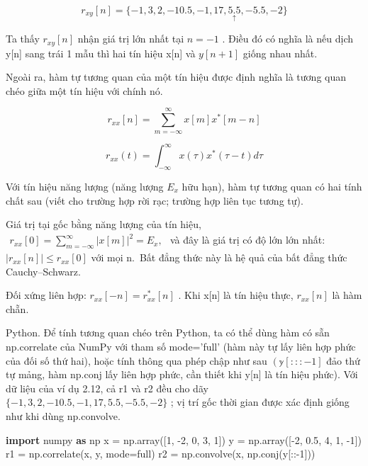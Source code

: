 \documentclass[
  10
]{article}
\newenvironment{Shaded}{}{}
\newcommand{\DecValTok}[1]{\textcolor[rgb]{0.25,0.63,0.44}{#1}}
\newcommand{\FloatTok}[1]{\textcolor[rgb]{0.25,0.63,0.44}{#1}}
\newcommand{\ImportTok}[1]{\textcolor[rgb]{0.00,0.50,0.00}{\textbf{#1}}}
\newcommand{\NormalTok}[1]{#1}
\newcommand{\OperatorTok}[1]{\textcolor[rgb]{0.40,0.40,0.40}{#1}}
\newcommand{\StringTok}[1]{\textcolor[rgb]{0.25,0.44,0.63}{#1}}
\begin{document}
\[
r _ {x y} [ n ] = \{- 1, 3, 2, - 1 0. 5, - 1, 1 7, \underset {\uparrow} {5. 5}, - 5. 5, - 2 \}
\]

Ta thấy \(r _ { x y } [ n ]\) nhận giá trị lớn nhất tại \(n = - 1\) .
Điều đó có nghĩa là nếu dịch y{[}n{]} sang trái 1 mẫu thì hai tín hiệu
x{[}n{]} và \(y [ n + 1 ]\) giống nhau nhất. 

Ngoài ra, hàm tự tương quan của một tín hiệu được định nghĩa là tương
quan chéo giữa một tín hiệu với chính nó.

\[
r _ {x x} [ n ] = \sum_ {m = - \infty} ^ {\infty} x [ m ] x ^ {*} [ m - n ]
\]

\[
r _ {x x} (t) = \int_ {- \infty} ^ {\infty} x (\tau) x ^ {*} (\tau - t) d \tau
\]

Với tín hiệu năng lượng (năng lượng \(E _ { x }\) hữu hạn), hàm tự tương
quan có hai tính chất sau (viết cho trường hợp rời rạc; trường hợp liên
tục tương tự).

Giá trị tại gốc bằng năng lượng của tín hiệu,
\(\begin{array} { r } { r _ { x x } [ 0 ] = \sum _ { m = - \infty } ^ { \infty } | x [ m ] | ^ { 2 } = E _ { x } , } \end{array}\)
và đây là giá trị có độ lớn lớn nhất:
\(| r _ { x x } [ n ] | \leq r _ { x x } [ 0 ]\) với mọi n.~Bất đẳng
thức này là hệ quả của bất đẳng thức Cauchy--Schwarz.

Đối xứng liên hợp: \(r _ { x x } [ - n ] = r _ { x x } ^ { * } [ n ]\) .
Khi x{[}n{]} là tín hiệu thực, \(r _ { x x } [ n ]\) là hàm chẵn.

Python. Để tính tương quan chéo trên Python, ta có thể dùng hàm có sẵn
np.correlate của NumPy với tham số mode='full' (hàm này tự lấy liên hợp
phức của đối số thứ hai), hoặc tính thông qua phép chập như sau
\(\left( \mathbb { y } \left[ : : : - 1 \right] \right.\) đảo thứ tự
mảng, hàm np.conj lấy liên hợp phức, cần thiết khi y{[}n{]} là tín hiệu
phức). Với dữ liệu của ví dụ 2.12, cả r1 và r2 đều cho dãy
\(\{ - 1 , 3 , 2 , - 1 0 . 5 , - 1 , 1 7 , 5 . 5 , - 5 . 5 , - 2 \}\) ;
vị trí gốc thời gian được xác định giống như khi dùng np.convolve.

\begin{Shaded}
\begin{Highlighting}[]
\ImportTok{import}\NormalTok{ numpy }\ImportTok{as}\NormalTok{ np}
\NormalTok{x }\OperatorTok{=}\NormalTok{ np.array([}\DecValTok{1}\NormalTok{, }\OperatorTok{{-}}\DecValTok{2}\NormalTok{, }\DecValTok{0}\NormalTok{, }\DecValTok{3}\NormalTok{, }\DecValTok{1}\NormalTok{])}
\NormalTok{y }\OperatorTok{=}\NormalTok{ np.array([}\OperatorTok{{-}}\DecValTok{2}\NormalTok{, }\FloatTok{0.5}\NormalTok{, }\DecValTok{4}\NormalTok{, }\DecValTok{1}\NormalTok{, }\OperatorTok{{-}}\DecValTok{1}\NormalTok{])}
\NormalTok{r1 }\OperatorTok{=}\NormalTok{ np.correlate(x, y, mode}\OperatorTok{=}\StringTok{\textquotesingle{}full\textquotesingle{}}\NormalTok{)}
\NormalTok{r2 }\OperatorTok{=}\NormalTok{ np.convolve(x, np.conj(y[::}\OperatorTok{{-}}\DecValTok{1}\NormalTok{])) }
\end{Highlighting}
\end{Shaded}
\end{document}

